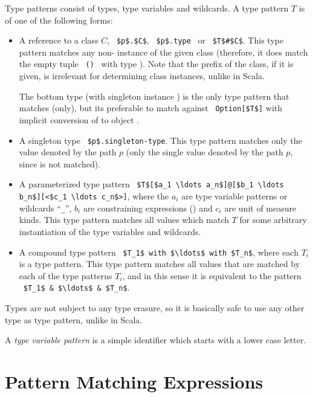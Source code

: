 Type patterns consist of types, type variables and wildcards. A type pattern $T$ is of one of the following forms: 
\begin{itemize}
\item[]
A reference to a class $C$, ~\lstinline!$p$.$C$!, ~\lstinline!$p$.type!~ or ~\lstinline!$T$#$C$!. This type pattern matches any non- instance of the given class (therefore, it does match the empty tuple ~\lstinline!()!~ with type ). Note that the prefix of the class, if it is given, is irrelevant for determining class instances, unlike in Scala. 

The bottom type  (with singleton instance ) is the only type pattern that matches  (only), but its preferable to match against ~\lstinline!Option[$T$]! with implicit conversion of  to object . 

\item[]
A singleton type ~\lstinline!$p$.singleton-type!. This type pattern matches only the value denoted by the path $p$ (only the single value denoted by the path $p$, since  is not matched). 

\item[]
A parameterized type pattern ~\lstinline!$T$[$a_1 \ldots a_n$]@[$b_1 \ldots b_n$][<$c_1 \ldots c_n$>]!, where the $a_i$ are type variable patterns or wildcards ``\lstinline!_!'', $b_i$ are constraining expressions () and $c_i$ are unit of measure kinds. This type pattern matches all values which match $T$ for some arbitrary instantiation of the type variables and wildcards.  

\item[]
A compound type pattern ~\lstinline!$T_1$ with $\ldots$ with $T_n$!, where each $T_i$ is a type pattern. This type pattern matches all values that are matched by each of the type patterns $T_i$, and in this sense it is equivalent to the pattern ~\lstinline!$T_1$ & $\ldots$ & $T_n$!. 
\end{itemize}

Types are not subject to any type erasure, so it is basically safe to use any other type as type pattern, unlike in Scala. 

A {\em type variable pattern} is a simple identifier which starts with a lower case letter. 






\section{Pattern Matching Expressions}

